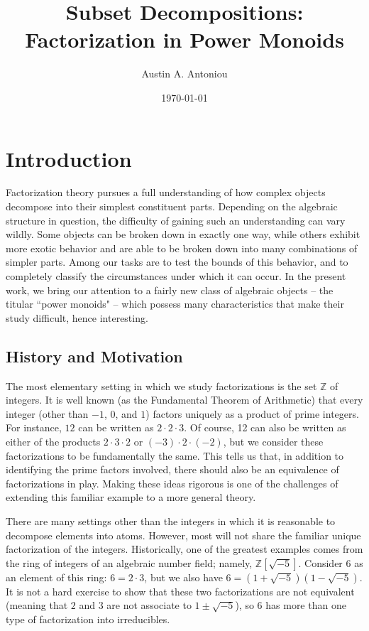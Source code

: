 \documentclass{report}
\title{Subset Decompositions: Factorization in Power Monoids}
\author{Austin A. Antoniou}
\date{\today}
\newcommand{\ZZ}{\mathbb{Z}}
\renewcommand{\:}{\text{:}}
\theoremstyle{definition}
\begin{document}
\maketitle

\tableofcontents


\chapter{Introduction}

Factorization theory pursues a full understanding of how complex objects decompose into their simplest constituent parts.  
Depending on the algebraic structure in question, the difficulty of gaining such an understanding can vary wildly. 
Some objects can be broken down in exactly one way, while others exhibit more exotic behavior and are able to be broken down into many combinations of simpler parts.
Among our tasks are to test the bounds of this behavior, and to completely classify the circumstances under which it can occur.
In the present work, we bring our attention to a fairly new class of algebraic objects -- the titular ``power monoids" --  which possess many characteristics that make their study difficult, hence interesting.

\section{History and Motivation}

The most elementary setting in which we study factorizations is the set $\ZZ$ of integers.
It is well known (as the Fundamental Theorem of Arithmetic) that every integer (other than $-1$, $0$, and $1$) factors uniquely as a product of prime integers.
For instance, $12$ can be written as $2\cdot 2\cdot 3$.
Of course, 12 can also be written as either of the products $2\cdot 3\cdot 2$ or $(-3)\cdot 2\cdot (-2)$, but we consider these factorizations to be fundamentally the same.  
This tells us that, in addition to identifying the prime factors involved, there should also be an equivalence of factorizations in play.
Making these ideas rigorous is one of the challenges of extending this familiar example to a more general theory.


There are many settings other than the integers in which it is reasonable to decompose elements into atoms. 
However, most will not share the familiar unique factorization of the integers.  
Historically, one of the greatest examples comes from the ring of integers of an algebraic number field; namely, $\ZZ[\sqrt{-5}]$.
Consider $6$ as an element of this ring: $6=2\cdot3$, but we also have $6 = (1+\sqrt{-5})(1-\sqrt{-5})$.
It is not a hard exercise to show that these two factorizations are not equivalent (meaning that $2$ and $3$ are not associate to $1\pm\sqrt{-5}$), so $6$ has more than one type of factorization into irreducibles.
\end{document}
